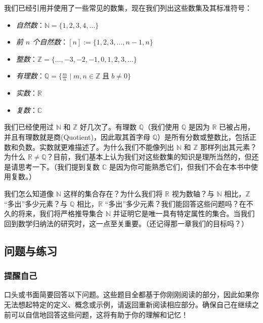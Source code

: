 我们已经引用并使用了一些常见的数集，现在我们列出这些数集及其标准符号：

\begin{center}
\begin{itemize}
    \item \textit{自然数}：$\mathbb{N} = \{1, 2, 3, 4, \dots \}$
    \item \textit{前 $n$ 个自然数}：$[n] := \{1, 2, 3, \dots , n-1, n \}$
    \item \textit{整数}：$\mathbb{Z} = \{\dots, -3, -2, -1, 0, 1, 2, 3, \dots \}$
    \item \textit{有理数}：$\mathbb{Q} = \{\frac{m}{n} \mid m,n \in \mathbb{Z} \;\text{且}\; b \ne 0 \}$
    \item \textit{实数}：$\mathbb{R}$
    \item \textit{复数}：$\mathbb{C}$
\end{itemize}
\end{center}

我们已经使用过 $\mathbb{N}$ 和 $\mathbb{Z}$ 好几次了。有理数 $\mathbb{Q}$（我们使用 $\mathbb{Q}$ 是因为 $\mathbb{R}$ 已被占用，并且有理数就是商(Quotient)，因此取其首字母 $\mathbb{Q}$）是所有分数或整数比，包括正数和负数。实数就更难描述了。为什么我们不能像列出 $\mathbb{N}$ 和 $\mathbb{Z}$ 那样列出其元素？为什么 $\mathbb{R} \ne \mathbb{Q}$？目前，我们基本上认为我们对这些数集的知识是理所当然的，但还是请思考一下。（我们提到复数 $\mathbb{C}$ 是因为你可能熟悉它们，但我们不会在本书中使用复数。）

我们怎么知道像 $\mathbb{N}$ 这样的集合存在？为什么我们将 $\mathbb{R}$ 视为数轴？与 $\mathbb{N}$ 相比，$\mathbb{Z}$ ``多出''多少元素？与 $\mathbb{Q}$ 相比，$\mathbb{R}$ ``多出''多少元素？我们能回答这些问题吗？在不久的将来，我们将严格推导集合 $\mathbb{N}$ 并证明它是唯一具有特定属性的集合。当我们回到数学归纳法的研究时，这一点至关重要。（还记得那一章我们的目标吗？）

\subsection{问题与练习}

\subsubsection*{提醒自己}

口头或书面简要回答以下问题。这些题目全都基于你刚刚阅读的部分，因此如果你无法想起特定的定义、概念或示例，请返回重新阅读相应部分。确保自己在继续之前可以自信地回答这些问题，这将有助于你的理解和记忆！

